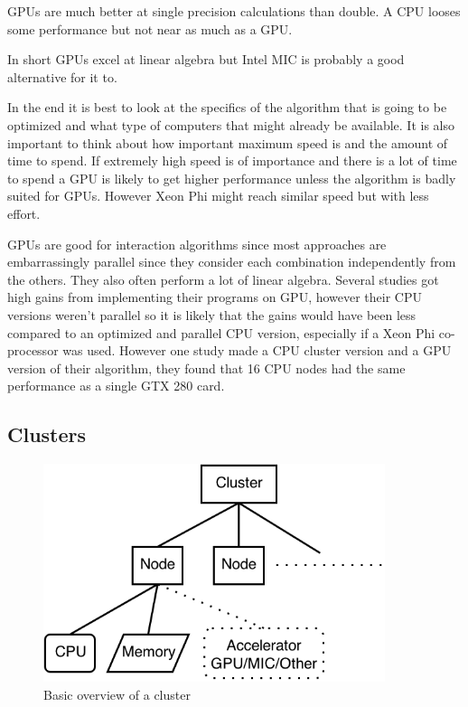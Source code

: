 \documentclass[10pt,a4paper]{report}
\begin{document}
GPUs are much better at single precision calculations than double\cite{nvtesla}. A CPU looses some performance but not near as much as a GPU\cite{cuda, nvtesla}.

In short GPUs excel at linear algebra but Intel MIC is probably a good alternative for it to.

In the end it is best to look at the specifics of the algorithm that is going to be optimized and what type of computers that might already be available. It is also important to think about how important maximum speed is and the amount of time to spend. If extremely high speed is of importance and there is a lot of time to spend a GPU is likely to get higher performance unless the algorithm is badly suited for GPUs. However Xeon Phi might reach similar speed but with less effort.

GPUs are good for interaction algorithms since most approaches are embarrassingly parallel since they consider each combination independently from the others. They also often perform a lot of linear algebra. Several studies got high gains from implementing their programs on GPU, however their CPU versions weren't parallel so it is likely that the gains would have been less compared to an optimized and parallel CPU version, especially if a Xeon Phi co-processor was used.\cite{gwis,gboost,gmdr_gpu,cuda_lr,genie_2012,plink_gpu} However one study made a CPU cluster version and a GPU version of their algorithm, they found that 16 CPU nodes had the same performance as a single GTX 280 card\cite{jiang_accelerating}.

\subsection{Clusters}
\label{clusers}

\begin{figure}[h]
    \centering
    \includegraphics[width=10cm]{Cluster.png}
    \caption{Basic overview of a cluster}
    \label{fig:cluster}
\end{figure}
\end{document}
